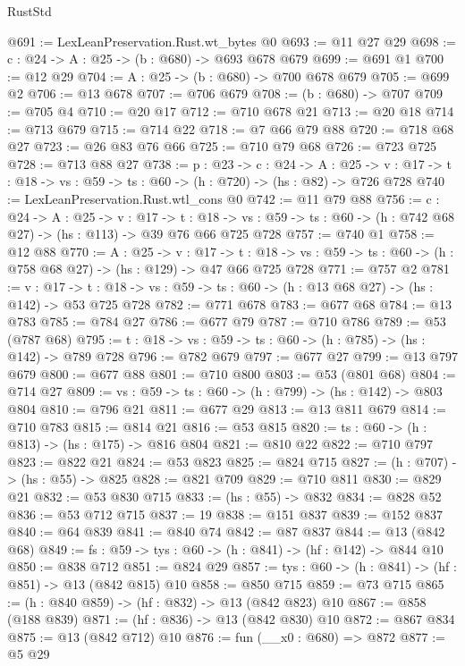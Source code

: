 \begin{lexlean}{RustStd}
\begin{coremodule}
@691 := LexLeanPreservation.Rust.wt_bytes @0
@693 := @11 @27 @29
@698 := {c : @24} -> {A : @25} -> (b : @680) -> @693 @678 @679
@699 := @691 @1
@700 := @12 @29
@704 := {A : @25} -> (b : @680) -> @700 @678 @679
@705 := @699 @2
@706 := @13 @678
@707 := @706 @679
@708 := (b : @680) -> @707
@709 := @705 @4
@710 := @20 @17
@712 := @710 @678 @21
@713 := @20 @18
@714 := @713 @679
@715 := @714 @22
@718 := @7 @66 @79 @88
@720 := @718 @68 @27
@723 := @26 @83 @76 @66
@725 := @710 @79 @68
@726 := @723 @725
@728 := @713 @88 @27
@738 := {p : @23} ->
  {c : @24} ->
  {A : @25} ->
  {v : @17} -> {t : @18} -> {vs : @59} -> {ts : @60} -> (h : @720) -> (hs : @82) -> @726 @728
@740 := LexLeanPreservation.Rust.wtl_cons @0
@742 := @11 @79 @88
@756 := {c : @24} ->
  {A : @25} ->
  {v : @17} ->
  {t : @18} ->
  {vs : @59} -> {ts : @60} -> (h : @742 @68 @27) -> (hs : @113) -> @39 @76 @66 @725 @728
@757 := @740 @1
@758 := @12 @88
@770 := {A : @25} ->
  {v : @17} ->
  {t : @18} -> {vs : @59} -> {ts : @60} -> (h : @758 @68 @27) -> (hs : @129) -> @47 @66 @725 @728
@771 := @757 @2
@781 := {v : @17} ->
  {t : @18} -> {vs : @59} -> {ts : @60} -> (h : @13 @68 @27) -> (hs : @142) -> @53 @725 @728
@782 := @771 @678
@783 := @677 @68
@784 := @13 @783
@785 := @784 @27
@786 := @677 @79
@787 := @710 @786
@789 := @53 (@787 @68)
@795 := {t : @18} -> {vs : @59} -> {ts : @60} -> (h : @785) -> (hs : @142) -> @789 @728
@796 := @782 @679
@797 := @677 @27
@799 := @13 @797 @679
@800 := @677 @88
@801 := @710 @800
@803 := @53 (@801 @68)
@804 := @714 @27
@809 := {vs : @59} -> {ts : @60} -> (h : @799) -> (hs : @142) -> @803 @804
@810 := @796 @21
@811 := @677 @29
@813 := @13 @811 @679
@814 := @710 @783
@815 := @814 @21
@816 := @53 @815
@820 := {ts : @60} -> (h : @813) -> (hs : @175) -> @816 @804
@821 := @810 @22
@822 := @710 @797
@823 := @822 @21
@824 := @53 @823
@825 := @824 @715
@827 := (h : @707) -> (hs : @55) -> @825
@828 := @821 @709
@829 := @710 @811
@830 := @829 @21
@832 := @53 @830 @715
@833 := (hs : @55) -> @832
@834 := @828 @52
@836 := @53 @712 @715
@837 := 19
@838 := @151 @837
@839 := @152 @837
@840 := @64 @839
@841 := @840 @74
@842 := @87 @837
@844 := @13 (@842 @68)
@849 := {fs : @59} -> {tys : @60} -> (h : @841) -> (hf : @142) -> @844 @10
@850 := @838 @712
@851 := @824 @29
@857 := {tys : @60} -> (h : @841) -> (hf : @851) -> @13 (@842 @815) @10
@858 := @850 @715
@859 := @73 @715
@865 := (h : @840 @859) -> (hf : @832) -> @13 (@842 @823) @10
@867 := @858 (@188 @839)
@871 := (hf : @836) -> @13 (@842 @830) @10
@872 := @867 @834
@875 := @13 (@842 @712) @10
@876 := fun (__x0 : @680) => @872
@877 := @5 @29

\end{coremodule}
\end{lexlean}
